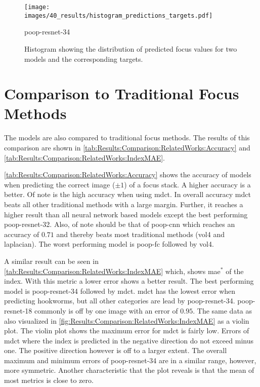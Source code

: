 \begin{figure}
    \centering
    \texttt{[image: images/40\_results/histogram\_predictions\_targets.pdf]}
    \caption{\acs{poop}-\acs{resnet}-34}
    \label{fig:Results:HistogramPredictedTarget:ResNet34}

    \caption[Distribution of predictions]{Histogram showing the distribution of predicted focus values for two models and the corresponding targets.}
    \label{fig:Results:HistogramPredictedTarget}
\end{figure}


\FloatBarrier

\section{Comparison to Traditional Focus Methods}
\label{sec:Results:TraditionalFocusMethods}

The models are also compared to traditional focus methods. The results of this comparison are shown in \autoref{tab:Results:Comparison:RelatedWorks:Accuracy} and \autoref{tab:Results:Comparison:RelatedWorks:IndexMAE}.

\autoref{tab:Results:Comparison:RelatedWorks:Accuracy} shows the accuracy of models when predicting the correct image ($\pm 1$) of a focus stack. A higher accuracy is a better. Of note is the high accuracy when using \ac{mdct}. In overall accuracy \ac{mdct} beats all other traditional methods with a large margin. Further, it reaches a higher result than all neural network based models except the best performing \acs{poop}-\acs{resnet}-32. Also, of note should be that of \acs{poop}-\acs{cnn} which reaches an accuracy of $0.71$ and thereby beats most traditional methods (\ac{vol4} and \ac{laplacian}). The worst performing model is \acs{poop}-\acs{fc} followed by \ac{vol4}.

A similar result can be seen in \autoref{tab:Results:Comparison:RelatedWorks:IndexMAE} which, shows \ac{mae}$^*$ of the index. With this metric a lower error shows a better result. The best performing model is \acs{poop}-\acs{resnet}-34 followed by \acs{mdct}. \Acs{mdct} has the lowest error when predicting hookworms, but all other categories are lead by \acs{poop}-\acs{resnet}-34. \Acs{poop}-\acs{resnet}-18 commonly is off by one image with an error of $0.95$. The same data as also visualized in \autoref{fig:Results:Comparison:RelatedWorks:IndexMAE} as a violin plot. The violin plot shows the maximum error for \ac{mdct} is fairly low. Errors of \ac{mdct} where the index is predicted in the negative direction do not exceed minus one. The positive direction however is off to a larger extent. The overall maximum and minimum errors of \acs{poop}-\acs{resnet}-34 are in a similar range, however, more symmetric. Another characteristic that the plot reveals is that the mean of most metrics is close to zero.


